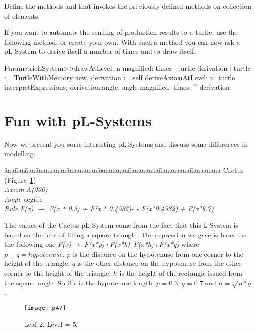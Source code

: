 Define the methods  and  that invokes the previously defined methods on collection of
elements.



If you want to automate the sending of production results to a turtle,
use the following method, or create your own. With such a method you
can now ask a pL-System to derive itself a number of times and to draw
itself.

\begin{method}
ParametricLSystem>>drawAtLevel: n magnified: times 
   | turtle derivation |
   turtle := TurtleWithMemory new.
   derivation := self deriveAxiomAtLevel: n.
   turtle
      interpretExpressions: derivation
      angle: angle
      magnified: times.
    ^ derivation
\end{method}




\section{Fun with pL-Systems}
Now we present you some interesting pL-Systems and discuss some
differences in modelling.



\begin{tabbing}
\=aaa\=aaa\=aaa\=aaaaaaaaa\=aaaaaaaaa\=aaaaaaaaa\=aaaaaaaaa\=aaaaaaaaa\=aaaaaaaaa\kill
Cactus (Figure~\ref{fig:p47})\\
\>\>\>\> \emph{Axiom} \>\>\emph{A(200)}\\
\>\>\>\> \emph{Angle} \> degree\\
\>\>\>\> \emph{Rule}  \>\>\emph{F(x) $\rightarrow$ F(x * 0.3) + F(x * 0.4582)- - F(x*0.4582) + F(x*0.7)}
\end{tabbing}

The values of the Cactus pL-System come from the fact that this
L-System is based on the idea of filling a square triangle. The expression we gave is based on the following one 
\emph{F(x)$\rightarrow$ F(x*p)+F(x*h)--F(x*h)+F(x*q)} where $p+q = hypotenuse$, $p$ is the distance on the hypotenuse from one corner to the height of the triangle, $q$ is the other  distance on the hypotenuse from the other corner to the height of the triangle, $h$ is the height of the rectangle issued from the square angle. So if $c$ is the hypotenuse length, $p=0.3$, $q=0.7$ and $h = \sqrt{p*q}$.


\begin{figure}[!htbp]
\centerline{\texttt{[image: p47]}}
\caption{Leaf 2, Level = 5,}
\label{fig:p47}
\end{figure}



